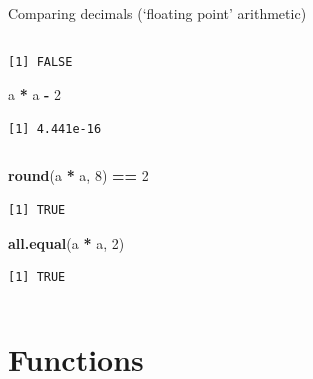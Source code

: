 \documentclass[
  11pt,
  ignorenonframetext,
]{beamer}
\newcommand{\VERB}{\Verb[commandchars=\\\{\}]}
\newenvironment{Shaded}{\begin{snugshade}}{\end{snugshade}}
\newcommand{\DecValTok}[1]{\textcolor[rgb]{0.00,0.00,0.81}{#1}}
\newcommand{\FunctionTok}[1]{\textcolor[rgb]{0.13,0.29,0.53}{\textbf{#1}}}
\newcommand{\NormalTok}[1]{#1}
\newcommand{\SpecialCharTok}[1]{\textcolor[rgb]{0.81,0.36,0.00}{\textbf{#1}}}
\begin{document}
\begin{frame}[fragile]{Comparing decimals (`floating point' arithmetic)}
\begin{columns}[T,onlytextwidth]
\begin{column}{0.48\textwidth}
\begin{verbatim}
[1] FALSE
\end{verbatim}

\begin{Shaded}
\begin{Highlighting}[]
\NormalTok{a }\SpecialCharTok{*}\NormalTok{ a }\SpecialCharTok{{-}} \DecValTok{2}
\end{Highlighting}
\end{Shaded}

\begin{verbatim}
[1] 4.441e-16
\end{verbatim}
\end{column}
\end{columns}

\begin{columns}[T,onlytextwidth]

\begin{column}{0.48\textwidth}
\begin{Shaded}
\begin{Highlighting}[]
\FunctionTok{round}\NormalTok{(a }\SpecialCharTok{*}\NormalTok{ a, }\DecValTok{8}\NormalTok{) }\SpecialCharTok{==} \DecValTok{2}
\end{Highlighting}
\end{Shaded}

\begin{verbatim}
[1] TRUE
\end{verbatim}

\begin{Shaded}
\begin{Highlighting}[]
\FunctionTok{all.equal}\NormalTok{(a }\SpecialCharTok{*}\NormalTok{ a, }\DecValTok{2}\NormalTok{)}
\end{Highlighting}
\end{Shaded}

\begin{verbatim}
[1] TRUE
\end{verbatim}
\end{column}
\end{columns}
\end{frame}

\hypertarget{functions}{%
\section{Functions}\label{functions}}
\end{document}
